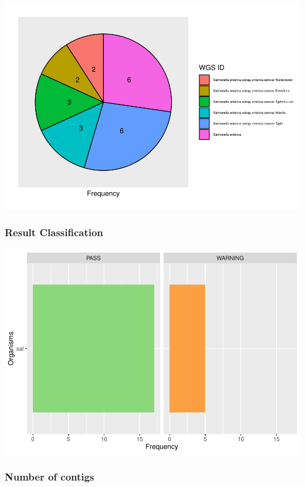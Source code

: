 \documentclass[
  a4paper,
]{article}
\begin{document}
\includegraphics{qualifyr_report_2024-07-28_files/figure-latex/pie_chart-1.pdf}

\subsubsection{Result Classification}\label{result-classification}

\includegraphics{qualifyr_report_2024-07-28_files/figure-latex/organism results-1.pdf}

\subsubsection{Number of contigs}\label{number-of-contigs}
\end{document}

